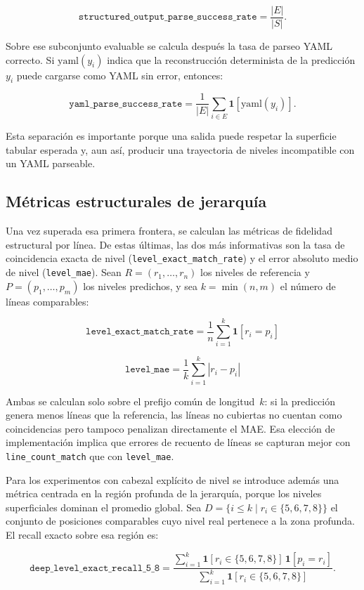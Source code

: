 \[
\texttt{structured\_output\_parse\_success\_rate}
= \frac{|E|}{|S|}.
\]

Sobre ese subconjunto evaluable se calcula después la tasa de parseo YAML correcto. Si \(\mathrm{yaml}(y_i)\) indica que la reconstrucción determinista de la predicción \(y_i\)
puede cargarse como YAML sin error, entonces:

\[
\texttt{yaml\_parse\_success\_rate}
= \frac{1}{|E|}\sum_{i \in E}\mathbf{1}[\mathrm{yaml}(y_i)].
\]

Esta separación es importante porque una salida puede respetar la superficie tabular esperada y, aun así, producir una trayectoria de niveles incompatible con un YAML parseable.

\subsection{Métricas estructurales de jerarquía}

Una vez superada esa primera frontera, se calculan las métricas de fidelidad estructural por línea. De estas últimas, las dos más informativas son
la tasa de coincidencia exacta de nivel (\texttt{level\_exact\_match\_rate}) y el error absoluto medio de nivel (\texttt{level\_mae}). Sean $R = (r_1, \dots, r_n)$
los niveles de referencia y $P = (p_1, \dots, p_m)$ los niveles predichos, y sea $k = \min(n, m)$ el número de líneas comparables:

$$\texttt{level\_exact\_match\_rate} = \frac{1}{n}\sum_{i=1}^{k} \mathbf{1}[r_i = p_i]$$

$$\texttt{level\_mae} = \frac{1}{k}\sum_{i=1}^{k} |r_i - p_i|$$

Ambas se calculan solo sobre el prefijo común de longitud~$k$: si la predicción genera menos líneas que la referencia, las líneas no cubiertas no
cuentan como coincidencias pero tampoco penalizan directamente el MAE. Esa elección de implementación implica que errores de recuento de líneas se
capturan mejor con \texttt{line\_count\_match} que con \texttt{level\_mae}.

Para los experimentos con cabezal explícito de nivel se introduce además una métrica centrada en la región profunda de la jerarquía, porque los niveles superficiales dominan el
promedio global. Sea \(D = \{i \leq k \mid r_i \in \{5,6,7,8\}\}\) el conjunto de posiciones comparables cuyo nivel real pertenece a la zona profunda. El recall exacto sobre
esa región es:

\[
\texttt{deep\_level\_exact\_recall\_5\_8}
=
\frac{\sum_{i=1}^{k}\mathbf{1}[r_i \in \{5,6,7,8\}]\,\mathbf{1}[p_i = r_i]}
{\sum_{i=1}^{k}\mathbf{1}[r_i \in \{5,6,7,8\}]}.
\]

